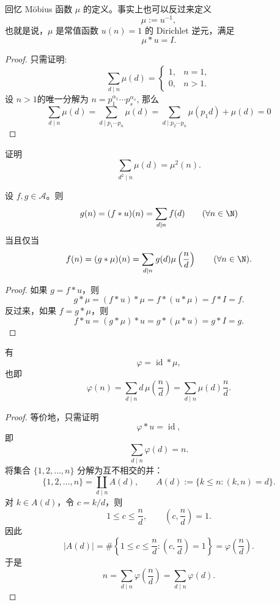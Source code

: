 回忆 Möbius 函数 $\mu$ 的定义。事实上也可以反过来定义
\[
	\mu:=u^{-1},
\]
也就是说，$\mu$ 是常值函数 $u(n)=1$ 的 Dirichlet 逆元，满足
\[
	\mu*u=I.
\]

\begin{proof}
只需证明:\[
	\sum_{d\mid n}\mu(d)=
	\begin{cases}
		1, & n=1,\\
		0, & n>1.
	\end{cases}
\]
设 $n>1$的唯一分解为 $n=p_1^{\alpha_1} \cdots p_s^{\alpha_s}$, 
那么 $$\sum_{d\mid n}\mu(d)=\sum_{d\mid p_1\cdots p_n}\mu(d)=\sum_{d\mid p_2\cdots p_n} \mu(p_1d)+\mu(d)=0$$

\end{proof}

\begin{exercise}
	证明
	\[
		\sum_{d^2\mid n}\mu(d)=\mu^2(n).
	\]
\end{exercise}

\begin{theorem}
	设 $f,g\in\mathcal A$。则
	\[
		g(n)=(f*u)(n)=\sum_{d\mid n}f(d)
		\qquad(\forall n\in\N)
	\]
	当且仅当
	\[
		f(n)=(g*\mu)(n)=\sum_{d\mid n}g(d)\mu\left(\frac nd\right)
		\qquad(\forall n\in\N).
	\]
\end{theorem}

\begin{proof}
	如果 $g=f*u$，则
	\[
		g*\mu=(f*u)*\mu=f*(u*\mu)=f*I=f.
	\]
	反过来，如果 $f=g*\mu$，则
	\[
		f*u=(g*\mu)*u=g*(\mu*u)=g*I=g.
	\]
\end{proof}

\begin{example}
	有
	\[
		\varphi=\operatorname{id}*\mu,
	\]
	也即
	\[
		\varphi(n)
		=
		\sum_{d\mid n}d\,\mu\left(\frac nd\right)
		=
		\sum_{d\mid n}\mu(d)\frac nd.
	\]
\end{example}

\begin{proof}
	等价地，只需证明
	\[
		\varphi*u=\operatorname{id},
	\]
	即
	\[
		\sum_{d\mid n}\varphi(d)=n.
	\]
	将集合 $\{1,2,\ldots,n\}$ 分解为互不相交的并：
	\[
		\{1,2,\ldots,n\}
		=
		\coprod_{d\mid n} A(d),
		\qquad
		A(d):=\{k\leq n:(k,n)=d\}.
	\]
	对 $k\in A(d)$，令 $c=k/d$，则
	\[
		1\leq c\leq \frac nd,\qquad \left(c,\frac nd\right)=1.
	\]
	因此
	\[
		|A(d)|
		=
		\#\left\{1\leq c\leq \frac nd:\left(c,\frac nd\right)=1\right\}
		=
		\varphi\left(\frac nd\right).
	\]
	于是
	\[
		n
		=
		\sum_{d\mid n}\varphi\left(\frac nd\right)
		=
		\sum_{d\mid n}\varphi(d).
	\]
\end{proof}

